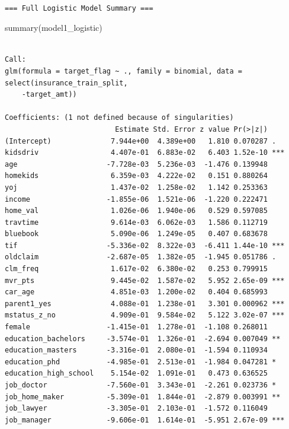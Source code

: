 \documentclass[
  11pt]{article}
\newenvironment{Shaded}{\begin{snugshade}}{\end{snugshade}}
\newcommand{\FunctionTok}[1]{\textcolor[rgb]{0.28,0.35,0.67}{#1}}
\newcommand{\NormalTok}[1]{\textcolor[rgb]{0.00,0.23,0.31}{#1}}
\begin{document}
\begin{verbatim}

=== Full Logistic Model Summary ===
\end{verbatim}

\begin{Shaded}
\begin{Highlighting}[]
\FunctionTok{summary}\NormalTok{(model1\_logistic)}
\end{Highlighting}
\end{Shaded}

\begin{verbatim}

Call:
glm(formula = target_flag ~ ., family = binomial, data = select(insurance_train_split, 
    -target_amt))

Coefficients: (1 not defined because of singularities)
                          Estimate Std. Error z value Pr(>|z|)    
(Intercept)              7.944e+00  4.389e+00   1.810 0.070287 .  
kidsdriv                 4.407e-01  6.883e-02   6.403 1.52e-10 ***
age                     -7.728e-03  5.236e-03  -1.476 0.139948    
homekids                 6.359e-03  4.222e-02   0.151 0.880264    
yoj                      1.437e-02  1.258e-02   1.142 0.253363    
income                  -1.855e-06  1.521e-06  -1.220 0.222471    
home_val                 1.026e-06  1.940e-06   0.529 0.597085    
travtime                 9.614e-03  6.062e-03   1.586 0.112719    
bluebook                 5.090e-06  1.249e-05   0.407 0.683678    
tif                     -5.336e-02  8.322e-03  -6.411 1.44e-10 ***
oldclaim                -2.687e-05  1.382e-05  -1.945 0.051786 .  
clm_freq                 1.617e-02  6.380e-02   0.253 0.799915    
mvr_pts                  9.445e-02  1.587e-02   5.952 2.65e-09 ***
car_age                  4.851e-03  1.200e-02   0.404 0.685993    
parent1_yes              4.088e-01  1.238e-01   3.301 0.000962 ***
mstatus_z_no             4.909e-01  9.584e-02   5.122 3.02e-07 ***
female                  -1.415e-01  1.278e-01  -1.108 0.268011    
education_bachelors     -3.574e-01  1.326e-01  -2.694 0.007049 ** 
education_masters       -3.316e-01  2.080e-01  -1.594 0.110934    
education_phd           -4.985e-01  2.513e-01  -1.984 0.047281 *  
education_high_school    5.154e-02  1.091e-01   0.473 0.636525    
job_doctor              -7.560e-01  3.343e-01  -2.261 0.023736 *  
job_home_maker          -5.309e-01  1.844e-01  -2.879 0.003991 ** 
job_lawyer              -3.305e-01  2.103e-01  -1.572 0.116049    
job_manager             -9.606e-01  1.614e-01  -5.951 2.67e-09 ***

\end{verbatim}
\end{document}
